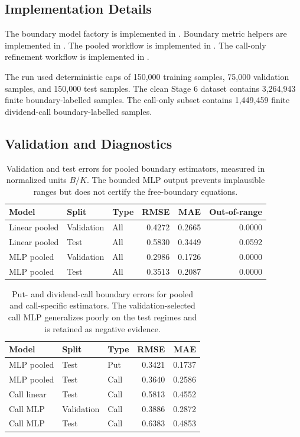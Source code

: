 \documentclass[11pt]{article}
\begin{document}
\subsection{Implementation Details}
The boundary model factory is implemented in . Boundary metric helpers are implemented in . The pooled workflow is implemented in . The call-only refinement workflow is implemented in .

The run used deterministic caps of 150,000 training samples, 75,000 validation samples, and 150,000 test samples. The clean Stage 6 dataset contains 3,264,943 finite boundary-labelled samples. The call-only subset contains 1,449,459 finite dividend-call boundary-labelled samples.

\subsection{Validation and Diagnostics}
\begin{table}[h]
\centering
\begin{tabular}{lllrrr}
\toprule
Model & Split & Type & RMSE & MAE & Out-of-range\\
\midrule
Linear pooled & Validation & All & 0.4272 & 0.2665 & 0.0000\\
Linear pooled & Test & All & 0.5830 & 0.3449 & 0.0592\\
MLP pooled & Validation & All & 0.2986 & 0.1726 & 0.0000\\
MLP pooled & Test & All & 0.3513 & 0.2087 & 0.0000\\
\bottomrule
\end{tabular}
\caption{Validation and test errors for pooled boundary estimators, measured in normalized units \(B/K\). The bounded MLP output prevents implausible ranges but does not certify the free-boundary equations.}
\end{table}

\begin{table}[h]
\centering
\begin{tabular}{lllrr}
\toprule
Model & Split & Type & RMSE & MAE\\
\midrule
MLP pooled & Test & Put & 0.3421 & 0.1737\\
MLP pooled & Test & Call & 0.3640 & 0.2586\\
Call linear & Test & Call & 0.5813 & 0.4552\\
Call MLP & Validation & Call & 0.3886 & 0.2872\\
Call MLP & Test & Call & 0.6383 & 0.4853\\
\bottomrule
\end{tabular}
\caption{Put- and dividend-call boundary errors for pooled and call-specific estimators. The validation-selected call MLP generalizes poorly on the test regimes and is retained as negative evidence.}
\end{table}
\end{document}
